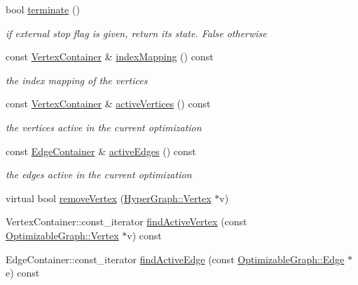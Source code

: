 \begin{DoxyCompactItemize}
\item 
bool \hyperlink{classg2o_1_1SparseOptimizer_ae592f525151d0cfb5bde3e7213f7ab11}{terminate} ()
\begin{DoxyCompactList}\small\item\em if external stop flag is given, return its state. False otherwise \end{DoxyCompactList}\item 
const \hyperlink{structg2o_1_1OptimizableGraph_a54f01b9b6071e65e6abeebe4afb29dec}{Vertex\+Container} \& \hyperlink{classg2o_1_1SparseOptimizer_a5e98a5f879f04c013b20f9c39a9057da}{index\+Mapping} () const 
\begin{DoxyCompactList}\small\item\em the index mapping of the vertices \end{DoxyCompactList}\item 
const \hyperlink{structg2o_1_1OptimizableGraph_a54f01b9b6071e65e6abeebe4afb29dec}{Vertex\+Container} \& \hyperlink{classg2o_1_1SparseOptimizer_a5715f0bab2cb9c1e8a330b2c3c217859}{active\+Vertices} () const 
\begin{DoxyCompactList}\small\item\em the vertices active in the current optimization \end{DoxyCompactList}\item 
const \hyperlink{structg2o_1_1OptimizableGraph_a2b43e807ae6d61ef8749ca1ef7c25f62}{Edge\+Container} \& \hyperlink{classg2o_1_1SparseOptimizer_aef20b7dd401862d572a851349d1bc124}{active\+Edges} () const 
\begin{DoxyCompactList}\small\item\em the edges active in the current optimization \end{DoxyCompactList}\item 
virtual bool \hyperlink{classg2o_1_1SparseOptimizer_a0fb2a5e2b250bf2530a600f6dcaad03f}{remove\+Vertex} (\hyperlink{classg2o_1_1HyperGraph_1_1Vertex}{Hyper\+Graph\+::\+Vertex} $\ast$v)
\item 
Vertex\+Container\+::const\+\_\+iterator \hyperlink{classg2o_1_1SparseOptimizer_a89ae01e9d070110a775d8a266717d719}{find\+Active\+Vertex} (const \hyperlink{classg2o_1_1OptimizableGraph_1_1Vertex}{Optimizable\+Graph\+::\+Vertex} $\ast$v) const 
\item 
Edge\+Container\+::const\+\_\+iterator \hyperlink{classg2o_1_1SparseOptimizer_a68b59bf6d56a390717b82b3ae009ccf0}{find\+Active\+Edge} (const \hyperlink{classg2o_1_1OptimizableGraph_1_1Edge}{Optimizable\+Graph\+::\+Edge} $\ast$e) const 

\end{DoxyCompactItemize}
